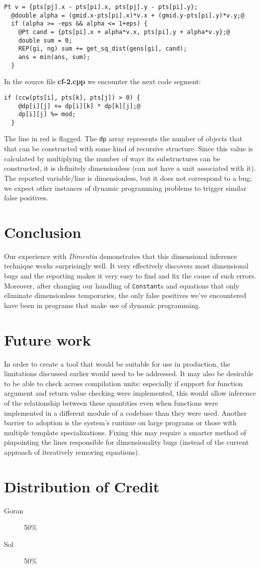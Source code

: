 \documentclass[12pt]{article}
\begin{document}
\begin{lstlisting}[label=proposal-full.cpp]
  Pt v = {pts[pj].x - pts[pi].x, pts[pj].y - pts[pi].y};
  @double alpha = (gmid.x-pts[pi].x)*v.x + (gmid.y-pts[pi].y)*v.y;@
  if (alpha >= -eps && alpha <= 1+eps) {
    @Pt cand = {pts[pi].x + alpha*v.x, pts[pi].y + alpha*v.y};@
    double sum = 0;
    REP(gi, ng) sum += get_sq_dist(gens[gi], cand);
    ans = min(ans, sum);
  }  
\end{lstlisting}

In the source file \textbf{cf-2.cpp} we encounter the next code segment:
\begin{lstlisting}[label=cf-2.cpp]
  if (ccw(pts[i], pts[k], pts[j]) > 0) {
    @dp[i][j] += dp[i][k] * dp[k][j];@
    dp[i][j] %= mod;
  }
\end{lstlisting}
The line in red is flagged.
The \texttt{dp} array represents the number of objects that that can be constructed with some kind of recursive structure.
Since this value is calculated by multiplying the number of ways its substructures can be constructed, it is definitely dimensionless (can not have a unit associated with it).
The reported variable/line is dimensionless, but it does not correspond to a bug; we expect other instances of dynamic programming problems to trigger similar false positives.

\section{Conclusion}

Our experience with \textit{Dimentia} demonstrates that this dimensional inference technique works surprisingly well.
It very effectively discovers most dimensional bugs and the reporting makes it very easy to find and fix the cause of such errors.
Moreover, after changing our handling of \texttt{Constant}s and equations that only eliminate dimensionless temporaries, the only false positives we've encountered have been in programs that make use of dynamic programming.

\section{Future work}

In order to create a tool that would be suitable for use in production, the limitations discussed earlier would need to be addressed.
It may also be desirable to be able to check across compilation units: especially if support for function argument and return value checking were implemented, this would allow inference of the relationship between these quantities even when functions were implemented in a different module of a codebase than they were used.
Another barrier to adoption is the system's runtime on large programs or those with multiple template specializations.
Fixing this may require a smarter method of pinpointing the lines responsible for dimensionality bugs (instead of the current approach of iteratively removing equations).

\section{Distribution of Credit}
\begin{description}
  \item[Goran] 50\%
    \item[Sol] 50\%
\end{description}



\end{document}
